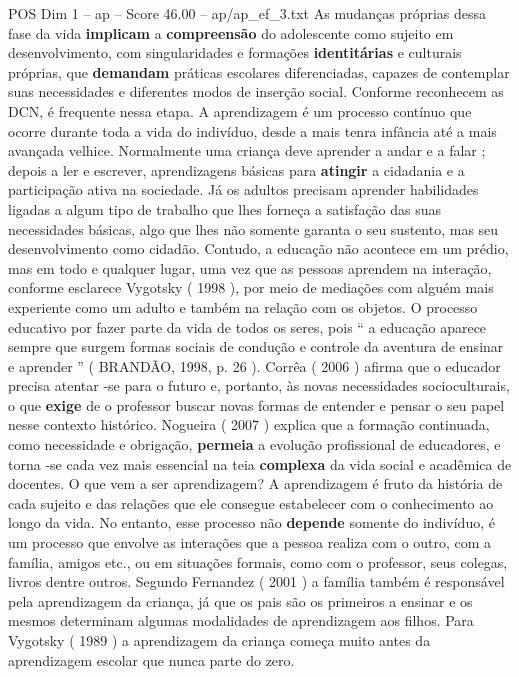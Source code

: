 \begin{textsample}{POS Dim 1 – ap – Score 46.00 – ap/ap\_ef\_3.txt}
As mudanças próprias dessa fase da vida \textbf{implicam} a \textbf{compreensão} do adolescente como sujeito em desenvolvimento, com singularidades e formações \textbf{identitárias} e culturais próprias, que \textbf{demandam} práticas escolares diferenciadas, capazes de contemplar suas necessidades e diferentes modos de inserção social.
Conforme reconhecem as DCN, é frequente nessa etapa.
A aprendizagem é um processo contínuo que ocorre durante toda a vida do indivíduo, desde a mais tenra infância até a mais avançada velhice.
Normalmente uma criança deve aprender a andar e a falar ; depois a ler e escrever, aprendizagens básicas para \textbf{atingir} a cidadania e a participação ativa na sociedade.
Já os adultos precisam aprender habilidades ligadas a algum tipo de trabalho que lhes forneça a satisfação das suas necessidades básicas, algo que lhes não somente garanta o seu sustento, mas seu desenvolvimento como cidadão.
Contudo, a educação não acontece em um prédio, mas em todo e qualquer lugar, uma vez que as pessoas aprendem na interação, conforme esclarece Vygotsky ( 1998 ), por meio de mediações com alguém mais experiente como um adulto e também na relação com os objetos.
O processo educativo por fazer parte da vida de todos os seres, pois “ a educação aparece sempre que surgem formas sociais de condução e controle da aventura de ensinar e aprender ” ( BRANDÃO, 1998, p. 26 ).
Corrêa ( 2006 ) afirma que o educador precisa atentar -se para o futuro e, portanto, às novas necessidades socioculturais, o que \textbf{exige} de o professor buscar novas formas de entender e pensar o seu papel nesse contexto histórico.
Nogueira ( 2007 ) explica que a formação continuada, como necessidade e obrigação, \textbf{permeia} a evolução profissional de educadores, e torna -se cada vez mais essencial na teia \textbf{complexa} da vida social e acadêmica de docentes.
O que vem a ser aprendizagem?
A aprendizagem é fruto da história de cada sujeito e das relações que ele consegue estabelecer com o conhecimento ao longo da vida.
No entanto, esse processo não \textbf{depende} somente do indivíduo, é um processo que envolve as interações que a pessoa realiza com o outro, com a família, amigos etc., ou em situações formais, como com o professor, seus colegas, livros dentre outros.
Segundo Fernandez ( 2001 ) a família também é responsável pela aprendizagem da criança, já que os pais são os primeiros a ensinar e os mesmos determinam algumas modalidades de aprendizagem aos filhos.
Para Vygotsky ( 1989 ) a aprendizagem da criança começa muito antes da aprendizagem escolar que nunca parte do zero.

\end{textsample}
